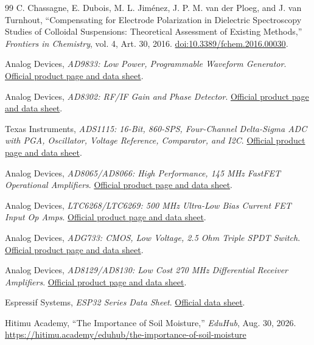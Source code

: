 \begin{thebibliography}{99}
C. Chassagne, E. Dubois, M. L. Jiménez, J. P. M. van der Ploeg,
and J. van Turnhout, ``Compensating for Electrode Polarization in
Dielectric Spectroscopy Studies of Colloidal Suspensions: Theoretical
Assessment of Existing Methods,'' \emph{Frontiers in Chemistry}, vol. 4,
Art. 30, 2016.
\href{https://doi.org/10.3389/fchem.2016.00030}{doi:10.3389/fchem.2016.00030}.


Analog Devices, \emph{AD9833: Low Power, Programmable Waveform
Generator}.
\href{https://www.analog.com/en/products/ad9833.html}{Official product
page and data sheet}.

Analog Devices, \emph{AD8302: RF/IF Gain and Phase Detector}.
\href{https://www.analog.com/en/products/ad8302.html}{Official product
page and data sheet}.

Texas Instruments, \emph{ADS1115: 16-Bit, 860-SPS, Four-Channel
Delta-Sigma ADC with PGA, Oscillator, Voltage Reference, Comparator, and
I2C}. \href{https://www.ti.com/product/ADS1115}{Official product page
and data sheet}.

Analog Devices, \emph{AD8065/AD8066: High Performance, 145 MHz
FastFET Operational Amplifiers}.
\href{https://www.analog.com/en/products/ad8066.html}{Official product
page and data sheet}.

Analog Devices, \emph{LTC6268/LTC6269: 500 MHz Ultra-Low Bias
Current FET Input Op Amps}.
\href{https://www.analog.com/en/products/ltc6268.html}{Official product
page and data sheet}.

Analog Devices, \emph{ADG733: CMOS, Low Voltage, 2.5 Ohm Triple
SPDT Switch}.
\href{https://www.analog.com/en/products/adg733.html}{Official product
page and data sheet}.

Analog Devices, \emph{AD8129/AD8130: Low Cost 270 MHz
Differential Receiver Amplifiers}.
\href{https://www.analog.com/en/products/ad8130.html}{Official product
page and data sheet}.

Espressif Systems, \emph{ESP32 Series Data Sheet}.
\href{https://www.espressif.com/sites/default/files/documentation/esp32_datasheet_en.pdf}{Official
data sheet}.




Hitimu Academy,
``The Importance of Soil Moisture,''
\emph{EduHub}, Aug. 30, 2026.
\href{https://hitimu.academy/eduhub/the-importance-of-soil-moisture}
{https://hitimu.academy/eduhub/the-importance-of-soil-moisture}


\end{thebibliography}
